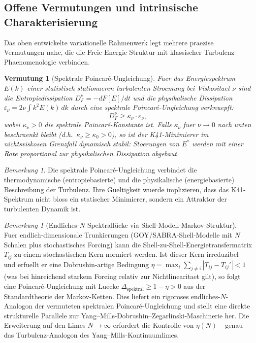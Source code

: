 \documentclass[12pt,a4paper]{article}
\theoremstyle{definition}
\theoremstyle{plain}
\newtheorem{conjecture}[definition]{Vermutung}
\theoremstyle{remark}
\newtheorem{remark}[definition]{Bemerkung}
\begin{document}
\subsection{Offene Vermutungen und intrinsische Charakterisierung}\label{sec:open-conjectures}

Das oben entwickelte variationelle Rahmenwerk legt mehrere praezise Vermutungen
nahe, die die Freie-Energie-Struktur mit klassischer Turbulenz-Phaenomenologie
verbinden.

\begin{conjecture}[Spektrale Poincar\'e-Ungleichung]
\label{conj:spectral-poincare}
Fuer das Energiespektrum $E(k)$ einer statistisch stationaeren turbulenten Stroemung bei Viskositaet $\nu$ sind die Entropiedissipation $D_F^\nu = -dF[E]/dt$ und die physikalische Dissipation $\varepsilon_\nu = 2\nu \int k^2 E(k)\, dk$ durch eine spektrale Poincar\'e-Ungleichung verknuepft:
\[
D_F^\nu \geq \kappa_\nu \cdot \varepsilon_\nu,
\]
wobei $\kappa_\nu > 0$ die spektrale Poincar\'e-Konstante ist. Falls $\kappa_\nu$ fuer $\nu \to 0$ nach unten beschraenkt bleibt (d.h.\ $\kappa_\nu \geq \kappa_0 > 0$), so ist der K41-Minimierer im nichtsviskosen Grenzfall dynamisch stabil: Stoerungen von $E^*$ werden mit einer Rate proportional zur physikalischen Dissipation abgebaut.
\end{conjecture}

\begin{remark}
Die spektrale Poincar\'e-Ungleichung verbindet die thermodynamische (entropiebasierte) und die physikalische (energiebasierte) Beschreibung der Turbulenz. Ihre Gueltigkeit wuerde implizieren, dass das K41-Spektrum nicht bloss ein statischer Minimierer, sondern ein Attraktor der turbulenten Dynamik ist.
\end{remark}

\begin{remark}[Endliches-$N$ Spektrall\"{u}cke via Shell-Modell-Markov-Struktur]\label{rem:finite-N-gap}
Fuer endlich-dimensionale Trunkierungen (GOY/SABRA-Shell-Modelle mit $N$ Schalen plus stochastisches Forcing) kann die Shell-zu-Shell-Energietransfermatrix $T_{ij}$ zu einem stochastischen Kern normiert werden. Ist dieser Kern irreduzibel und erfuellt er eine Dobrushin-artige Bedingung $\eta = \max_i \sum_{j \neq i} |T_{ij} - T_{ij}'| < 1$ (was bei hinreichend starkem Forcing relativ zur Nichtlinearitaet gilt), so folgt eine Poincar\'e-Ungleichung mit Luecke $\Delta_{\mathrm{spektral}} \geq 1 - \eta > 0$ aus der Standardtheorie der Markov-Ketten. Dies liefert ein rigoroses endliches-$N$-Analogon der vermuteten spektralen Poincar\'e-Ungleichung und stellt eine direkte strukturelle Parallele zur Yang--Mills-Dobrushin--Zegarlinski-Maschinerie \cite{Geiger2026-YM} her. Die Erweiterung auf den Limes $N \to \infty$ erfordert die Kontrolle von $\eta(N)$ -- genau das Turbulenz-Analogon des Yang--Mills-Kontinuumlimes.
\end{remark}
\end{document}
